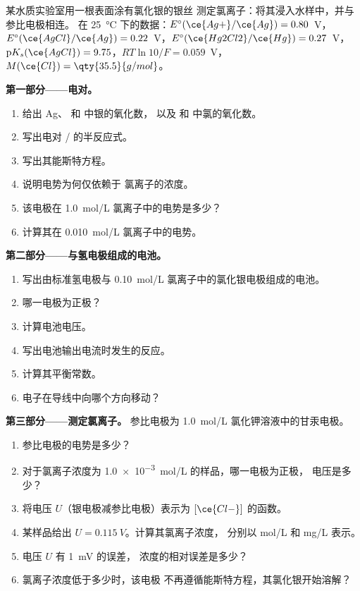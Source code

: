 \begin{problem}
\label{pb:b1:nernst:1}
某水质实验室用一根表面涂有氯化银的银丝
测定氯离子：将其浸入水样中，并与参比电极相连。
在 \qty{25}{\celsius} 下的数据：$E^\circ(\ce{Ag+}/\ce{Ag}) = 0.80$~V，
$E^\circ(\ce{AgCl}/\ce{Ag}) = 0.22$~V，$E^\circ(\ce{Hg2Cl2}/\ce{Hg}) =
0.27$~V，$\mathrm{p}K_s(\ce{AgCl}) = 9.75$，$RT\ln 10/F = 0.059$~V，
$M(\ce{Cl}) = \qty{35.5}{g/mol}$。

\medskip
\noindent\textbf{第一部分——电对。}
\begin{enumerate}
  \item 给出 Ag、 和  中银的氧化数，
        以及  和  中氯的氧化数。
  \item 写出电对 / 的半反应式。
  \item 写出其能斯特方程。
  \item 说明电势为何仅依赖于
        氯离子的浓度。
  \item 该电极在 \qty{1.0}{mol/L}
        氯离子中的电势是多少？
  \item 计算其在 \qty{0.010}{mol/L} 氯离子中的电势。
\end{enumerate}

\medskip
\noindent\textbf{第二部分——与氢电极组成的电池。}
\begin{enumerate}[resume]
  \item 写出由标准氢电极与
        \qty{0.10}{mol/L} 氯离子中的氯化银电极组成的电池。
  \item 哪一电极为正极？
  \item 计算电池电压。
  \item 写出电池输出电流时发生的反应。
  \item 计算其平衡常数。
  \item 电子在导线中向哪个方向移动？
\end{enumerate}

\medskip
\noindent\textbf{第三部分——测定氯离子。}
参比电极为 \qty{1.0}{mol/L}
氯化钾溶液中的甘汞电极。
\begin{enumerate}[resume]
  \item 参比电极的电势是多少？
  \item 对于氯离子浓度为 \qty{1.0e-3}{mol/L} 的样品，哪一电极为正极，
        电压是多少？
  \item 将电压 $U$（银电极减参比电极）表示为
        $[\ce{Cl-}]$ 的函数。
  \item 某样品给出 $U = \qty{0.115}{V}$。计算其氯离子浓度，
        分别以 \unit{mol/L} 和 \unit{mg/L} 表示。
  \item 电压 $U$ 有 \qty{1}{mV} 的误差，
        浓度的相对误差是多少？
  \item 氯离子浓度低于多少时，该电极
        不再遵循能斯特方程，其氯化银开始溶解？
\end{enumerate}


\end{problem}
